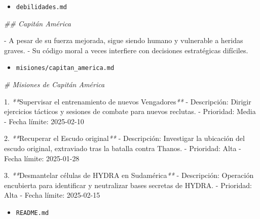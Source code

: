 \documentclass[
]{book}
\newenvironment{Shaded}{\begin{snugshade}}{\end{snugshade}}
\newcommand{\CommentTok}[1]{\textcolor[rgb]{0.56,0.35,0.01}{\textit{#1}}}
\newcommand{\ExtensionTok}[1]{#1}
\newcommand{\NormalTok}[1]{#1}
\newcommand{\PreprocessorTok}[1]{\textcolor[rgb]{0.56,0.35,0.01}{\textit{#1}}}
\providecommand{\tightlist}{%
  \setlength{\itemsep}{0pt}\setlength{\parskip}{0pt}}
\begin{document}
\begin{itemize}
\tightlist
\item
  \texttt{debilidades.md}
\end{itemize}

\begin{Shaded}
\begin{Highlighting}[]
\CommentTok{\#\# Capitán América}

\ExtensionTok{{-}}\NormalTok{ A pesar de su fuerza mejorada, sigue siendo humano y vulnerable a heridas graves.}
\ExtensionTok{{-}}\NormalTok{ Su código moral a veces interfiere con decisiones estratégicas difíciles.}
\end{Highlighting}
\end{Shaded}

\begin{itemize}
\tightlist
\item
  \texttt{misiones/capitan\_america.md}
\end{itemize}

\begin{Shaded}
\begin{Highlighting}[]
\CommentTok{\# Misiones de Capitán América}

\ExtensionTok{1.} \PreprocessorTok{**}\NormalTok{Supervisar el entrenamiento de nuevos Vengadores}\PreprocessorTok{**}
   \ExtensionTok{{-}}\NormalTok{ Descripción: Dirigir ejercicios tácticos y sesiones de combate para nuevos reclutas.}
   \ExtensionTok{{-}}\NormalTok{ Prioridad: Media}
   \ExtensionTok{{-}}\NormalTok{ Fecha límite: 2025{-}02{-}10}

\ExtensionTok{2.} \PreprocessorTok{**}\NormalTok{Recuperar el Escudo original}\PreprocessorTok{**}
   \ExtensionTok{{-}}\NormalTok{ Descripción: Investigar la ubicación del escudo original, extraviado tras la batalla contra Thanos.}
   \ExtensionTok{{-}}\NormalTok{ Prioridad: Alta}
   \ExtensionTok{{-}}\NormalTok{ Fecha límite: 2025{-}01{-}28}

\ExtensionTok{3.} \PreprocessorTok{**}\NormalTok{Desmantelar células de HYDRA en Sudamérica}\PreprocessorTok{**}
   \ExtensionTok{{-}}\NormalTok{ Descripción: Operación encubierta para identificar y neutralizar bases secretas de HYDRA.}
   \ExtensionTok{{-}}\NormalTok{ Prioridad: Alta}
   \ExtensionTok{{-}}\NormalTok{ Fecha límite: 2025{-}02{-}15}
\end{Highlighting}
\end{Shaded}

\begin{itemize}
\tightlist
\item
  \texttt{README.md}
\end{itemize}
\end{document}
